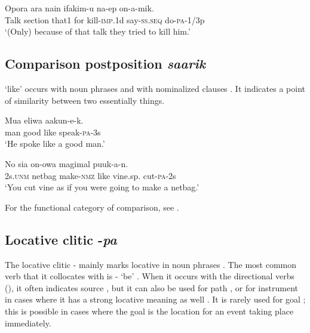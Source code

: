 \ea%
\label{ex:3:x759}
\gll Opora ara nain  ifakim-u na-ep on-a-mik. \\
Talk section that1 for kill-\textsc{imp}.1d say-\textsc{ss}.\textsc{seq} do-\textsc{pa}-1/3p\\
\glt`(Only) because of that talk they tried to kill him.'
\z

\subsection{Comparison postposition \textit{saarik}}\label{sec:3:y:x}
{}
 `like' occurs with noun phrases  and with nominalized clauses . It indicates a point of similarity between two essentially  things.

\ea%
\label{ex:3:x760}
\gll Mua eliwa  aakun-e-k. \\
man good like speak-\textsc{pa}-3s\\
\glt`He spoke like a good man.'
\z

\ea%
\label{ex:3:x761}
\gll No sia on-owa  magimal puuk-a-n. \\
2s.\textsc{unm} netbag make-\textsc{nmz} like vine.sp. cut-\textsc{pa}-2s\\
\glt`You cut  vine as if you were going to make a netbag.'
\z

For the functional category of comparison, see .

\subsection{Locative clitic -\textit{pa}}\label{sec:3:y:x}
{}
The locative clitic - mainly marks locative in noun phrases . The most common verb that it collocates with is - `be' . When it occurs with the directional verbs (), it often indicates source , but it can also be used for path , or for instrument in cases where it has a strong locative meaning as well . It is rarely used for goal ; this is possible in cases where the goal is the location for an event taking place immediately.

